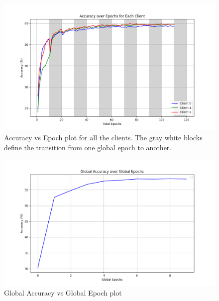 \documentclass[12pt]{article}
\begin{document}
	\begin{figure}
		\centering
		\includegraphics[width=\linewidth]{acc_vs_epoch}
		\caption{Accuracy vs Epoch plot for all the clients. The gray white blocks define the transition from one global epoch to another.}
		\label{fig:acc_vs_epoch}
	\end{figure}
	
	\begin{figure}
		\centering
		\includegraphics[width=\linewidth]{global_acc_vs_epoch}
		\caption{Global Accuracy vs Global Epoch plot}
		\label{fig:global_acc_vs_epoch}
	\end{figure}
	
\end{document}
